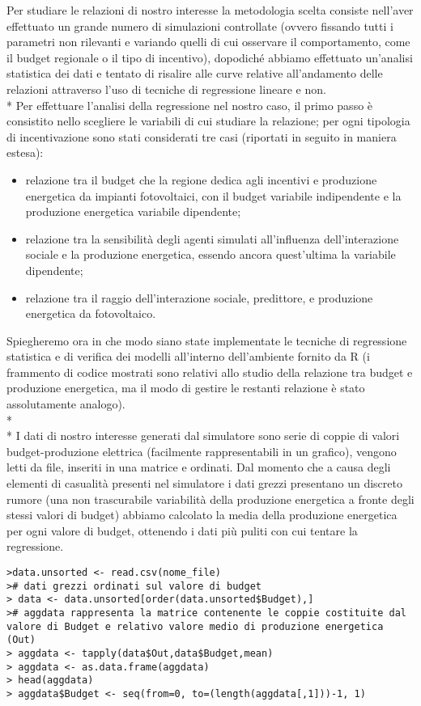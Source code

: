 \documentclass[12pt,a4paper,openright,twoside]{report}
\begin{document}
Per studiare le relazioni di nostro interesse la metodologia scelta consiste nell'aver effettuato un grande numero di simulazioni controllate (ovvero fissando tutti i parametri non rilevanti e variando quelli di cui osservare il comportamento, come il budget regionale o il tipo di incentivo), dopodiché abbiamo effettuato un'analisi statistica dei dati e tentato di risalire alle curve relative all'andamento delle relazioni attraverso l'uso di tecniche di regressione lineare e non.\\*
Per effettuare l'analisi della regressione nel nostro caso, il primo passo è consistito nello scegliere le variabili di cui studiare la relazione; per ogni tipologia di incentivazione sono stati considerati tre casi (riportati in seguito in maniera estesa):
\begin{itemize}
\item relazione tra il budget che la regione dedica agli incentivi e produzione energetica da impianti fotovoltaici, con il budget variabile indipendente e la produzione energetica variabile dipendente;
\item relazione tra la sensibilità degli agenti simulati all'influenza dell'interazione sociale e la produzione energetica, essendo ancora quest'ultima la variabile dipendente;
\item relazione tra il raggio dell'interazione sociale, predittore, e produzione energetica da fotovoltaico.
\end{itemize}

Spiegheremo ora in che modo siano state implementate le tecniche di regressione statistica e di verifica dei modelli all'interno dell'ambiente fornito da R (i frammento di codice mostrati sono relativi allo studio della relazione tra budget e produzione energetica, ma il modo di gestire le restanti relazione è stato assolutamente analogo).\\*\\*
I dati di nostro interesse generati dal simulatore sono serie di coppie di valori budget-produzione elettrica (facilmente rappresentabili in un grafico), vengono letti da file, inseriti in una matrice e ordinati. Dal momento che a causa degli elementi di casualità presenti nel simulatore i dati grezzi presentano un discreto rumore (una non trascurabile variabilità della produzione energetica a fronte degli stessi valori di budget) abbiamo calcolato la media della produzione energetica per ogni valore di budget, ottenendo i dati più puliti con cui tentare la regressione.

\begin{lstlisting}
>data.unsorted <- read.csv(nome_file)
># dati grezzi ordinati sul valore di budget
> data <- data.unsorted[order(data.unsorted$Budget),]
># aggdata rappresenta la matrice contenente le coppie costituite dal valore di Budget e relativo valore medio di produzione energetica (Out)
> aggdata <- tapply(data$Out,data$Budget,mean)
> aggdata <- as.data.frame(aggdata)  
> head(aggdata)
> aggdata$Budget <- seq(from=0, to=(length(aggdata[,1]))-1, 1)
\end{lstlisting}
 
\end{document}

